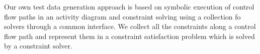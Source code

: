 Our own test data generation approach is based on symbolic execution of control flow paths in an activity diagram and constraint solving using a collection fo solvers through a common interface. We collect all the constraints along a control flow path and represent them in a constraint satisfaction problem which is solved by a constraint solver.
% 
% 
% 

